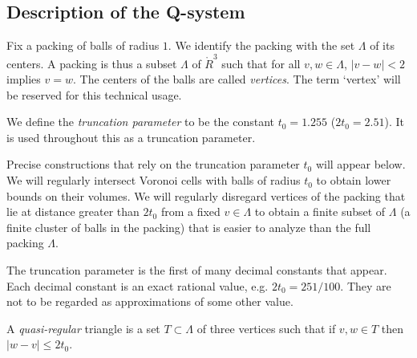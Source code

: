 \subsection{Description of the Q-system}
\label{sec:Q-describe}
\label{sec:construction}



Fix a packing of balls of radius $1$. We identify the packing with
the set $\Lambda$ of its centers.  A packing is thus a subset
$\Lambda$ of $\ring{R}^3$ such that for all $v,w\in\Lambda$,
$|v-w|<2$ implies $v=w$. The centers of the balls are called {\it
{} vertices}. The term `vertex' will be reserved for
this technical usage.  


\begin{definition}  We define the {\it truncation parameter}
 to be the constant
$t_0=1.255$ ($2t_0 = 2.51$). It is used throughout this \paper as
a truncation parameter.
\end{definition}

\bigskip



Precise constructions that rely on the truncation parameter $t_0$
will appear below.  We will regularly intersect Voronoi cells with
balls of radius $t_0$ to obtain lower bounds on their volumes.  We
will regularly disregard vertices of the packing that lie at
distance greater than $2t_0$ from a fixed $v\in\Lambda$ to obtain
a finite subset of $\Lambda$ (a finite cluster of balls in the
packing) that is easier to analyze than the full packing
$\Lambda$.

The truncation parameter is the first of many decimal constants
that appear. Each decimal constant is an exact rational value,
e.g. $2t_0 = 251/100$.  They are not to be regarded as
approximations of some other value.

\begin{definition}
A {\it quasi-regular\/} triangle is
a set $T\subset \Lambda$ of three vertices such that if $v,w\in T$
then $|w-v|\le2t_0$. \end{definition}

